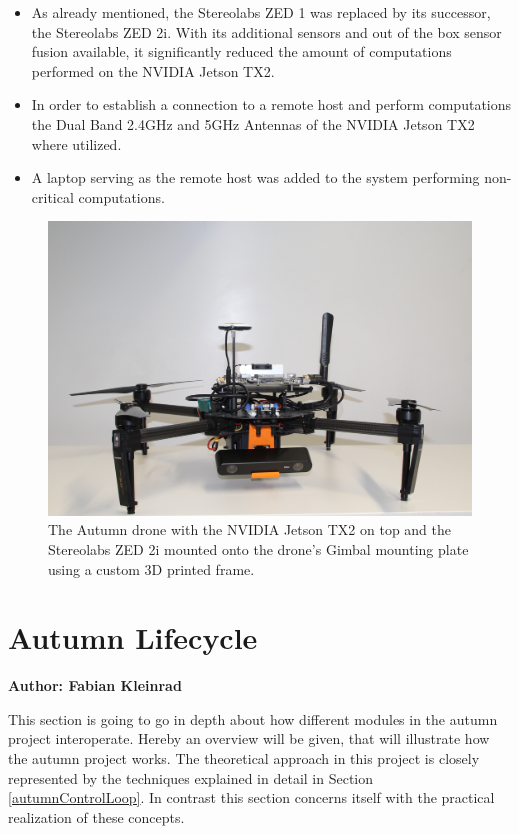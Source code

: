 \begin{itemize}
	\item As already mentioned, the Stereolabs ZED 1 was replaced by its successor, the Stereolabs ZED 2i. With its additional sensors and out of the box sensor fusion available, it significantly reduced the amount of computations performed on the NVIDIA Jetson TX2. 
	\item In order to establish a connection to a remote host and perform computations the Dual Band 2.4GHz and 5GHz Antennas of the NVIDIA Jetson TX2 where utilized. 
	\item A laptop serving as the remote host was added to the system performing non-critical computations.
\end{itemize}

\begin{figure}
	\centering
	\includegraphics[width=0.9\linewidth]{img/autumnDrone}
	\caption{
		The Autumn drone with the NVIDIA Jetson TX2 on top and the Stereolabs ZED 2i mounted onto the drone's Gimbal mounting plate using a custom 3D printed frame. 
	}
	\label{fig:autumn}
\end{figure}


\section{Autumn Lifecycle}
\textbf{Author: Fabian Kleinrad} 

This section is going to go in depth about how different modules in the autumn project interoperate. Hereby an overview will be given, that will illustrate how the autumn project works. The theoretical approach in this project is closely represented by the techniques explained in detail in Section 
\ref{autumnControlLoop}. In contrast this section concerns itself with the practical realization of these concepts.

